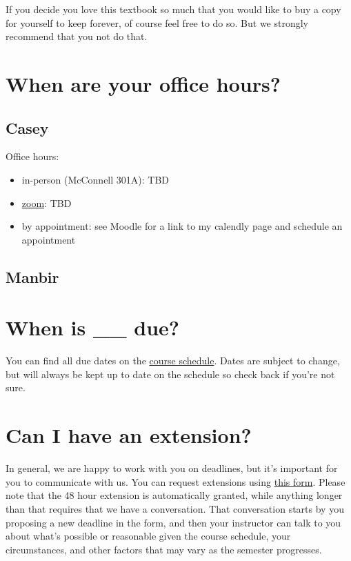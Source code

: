 \documentclass[
  letterpaper,
  DIV=11,
  numbers=noendperiod]{scrartcl}
\providecommand{\tightlist}{%
  \setlength{\itemsep}{0pt}\setlength{\parskip}{0pt}}\usepackage{longtable,booktabs,array}
\begin{document}
If you decide you love this textbook so much that you would like to buy
a copy for yourself to keep forever, of course feel free to do so. But
we strongly recommend that you not do that.

\hypertarget{officehours}{%
\section{When are your office hours?}\label{officehours}}

\subsection{Casey}

Office hours:

\begin{itemize}
\tightlist
\item
  in-person (McConnell 301A): TBD
\item
  \href{https://smith.zoom.us/j/98280229454}{zoom}: TBD
\item
  by appointment: see Moodle for a link to my calendly page and schedule
  an appointment
\end{itemize}

\subsection{Manbir}

\hypertarget{duedates}{%
\section{When is \_\_ due?}\label{duedates}}

You can find all due dates on the
\href{https://docs.google.com/spreadsheets/d/1NN6zv30J_MdUYzjDmjOMn1q-IKhxN0H8w9O3rMQsQ1A/edit?usp=sharing}{course
schedule}. Dates are subject to change, but will always be kept up to
date on the schedule so check back if you're not sure.

\hypertarget{extensionpolicy}{%
\section{Can I have an extension?}\label{extensionpolicy}}

In general, we are happy to work with you on deadlines, but it's
important for you to communicate with us. You can request extensions
using \href{https://forms.gle/qTLy66bkUNZ5ibTj7}{this form}. Please note
that the 48 hour extension is automatically granted, while anything
longer than that requires that we have a conversation. That conversation
starts by you proposing a new deadline in the form, and then your
instructor can talk to you about what's possible or reasonable given the
course schedule, your circumstances, and other factors that may vary as
the semester progresses.
\end{document}
